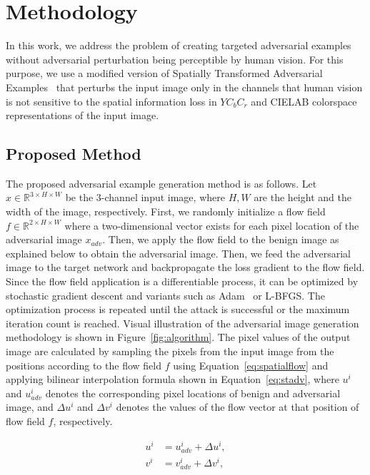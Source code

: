 \chapter{Methodology}
\label{chp:3_methodology}
In this work, we address the problem of creating targeted adversarial examples without adversarial perturbation being perceptible by human vision. For this purpose, we use a modified version of Spatially Transformed Adversarial Examples~\cite{xiao2018spatially} that perturbs the input image only in the channels that human vision is not sensitive to the spatial information loss in \(YC_{b}C_{r}\) and CIELAB colorspace representations of the input image.

\section{Proposed Method}

The proposed adversarial example generation method is as follows. Let \(x \in \mathbb{R}^{3\times H \times W}\) be the 3-channel input image, where \(H, W\) are the height and the width of the image, respectively. First, we randomly initialize a flow field \(f \in \mathbb{R}^{2\times H \times W}\) where a two-dimensional vector exists for each pixel location of the adversarial image \(x_{adv}\). Then, we apply the flow field to the benign image as explained below to obtain the adversarial image. Then, we feed the adversarial image to the target network and backpropagate the loss gradient to the flow field. Since the flow field application is a differentiable process, it can be optimized by stochastic gradient descent and variants such as Adam~\cite{kingma2015adam} or L-BFGS\cite{liu1989limited}. The optimization process is repeated until the attack is successful or the maximum iteration count is reached. Visual illustration of the adversarial image generation methodology is shown in Figure~\ref{fig:algorithm}. The pixel values of the output image are calculated by sampling the pixels from the input image from the positions according to the flow field \(f\) using Equation~\ref{eq:spatialflow} and applying bilinear interpolation formula shown in Equation~\ref{eq:stadv}, where \(u^{i}\) and \(u_{adv}^{i}\) denotes the corresponding pixel locations of benign and adversarial image, and \(\Delta u^i\) and \(\Delta v^i\) denotes the values of the flow vector at that position of flow field \(f\), respectively.


\begin{equation}
    \label{eq:spatialflow}
    \begin{split}
        u^i &= u_{adv}^i + \Delta u^i, \\
        v^i &= v_{adv}^i + \Delta v^i,
    \end{split}
\end{equation}


